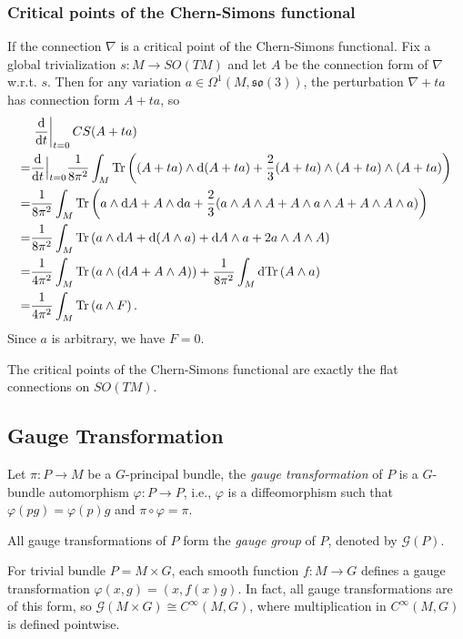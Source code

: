 \subsubsection*{Critical points of the Chern-Simons functional}
If the connection $\nabla$ is a critical point of the Chern-Simons functional.
Fix a global trivialization $s: M \to SO(TM)$ and let $A$ be the connection form of $\nabla$ w.r.t. $s$. 
Then for any variation $a \in \Omega^1(M, \mathfrak{so}(3))$, the perturbation $\nabla + ta$ has connection form $A + ta$, so
\begin{align*}
    &\left.\frac{\mathrm{d} }{\mathrm{d} t}\right|_{t=0}CS(A + ta) \\ 
    =& \frac{\mathrm{d} }{\mathrm{d} t}\Big|_{t=0} \frac{1}{8\pi^2}\int_M {\rm Tr}\left((A + ta) \wedge \mathrm{d}(A + ta) + \frac{2}{3}(A + ta) \wedge (A + ta) \wedge (A + ta)\right) \\ 
    =& \frac{1}{8\pi^2}\int_M {\rm Tr}\left(a \wedge \mathrm{d}A + A \wedge \mathrm{d}a + \frac{2}{3}(a \wedge A \wedge A + A \wedge a \wedge A + A \wedge A \wedge a)\right) \\ 
    =& \frac{1}{8\pi^2}\int_M {\rm Tr}\left(a \wedge \mathrm{d}A + {\rm d}(A\wedge a) + {\rm d} A\wedge a + 2a \wedge A \wedge A\right) \\ 
    =& \frac{1}{4\pi^2}\int_M {\rm Tr}\left(a \wedge ({\rm d} A + A\wedge A)\right) + \frac{1}{8\pi^2}\int_M {\rm d}{\rm Tr}\left(A\wedge a\right) \\ 
    =& \frac{1}{4\pi^2}\int_M {\rm Tr}\left(a \wedge F\right).
\end{align*}
Since $a$ is arbitrary, we have $F = 0$.
\begin{theorem}
    The critical points of the Chern-Simons functional are exactly the flat connections on $SO(TM)$.
\end{theorem}

\subsection{Gauge Transformation}
\begin{definition}
Let $\pi:P\to M$ be a $G$-principal bundle, the \emph{gauge transformation} of $P$ is a $G$-bundle automorphism $\varphi: P \to P$, 
i.e., $\varphi$ is a diffeomorphism such that $\varphi(pg) = \varphi(p)g$ and $\pi \circ \varphi = \pi$. 
\begin{center}
\end{center}
All gauge transformations of $P$ form the \emph{gauge group} of $P$, denoted by $\mathcal{G}(P)$.
\end{definition}
\begin{example}
    For trivial bundle $P = M \times G$, each smooth function $f: M \to G$ defines a gauge transformation $\varphi(x,g) = (x, f(x)g)$. 
    In fact, all gauge transformations are of this form, so $\mathcal{G}(M\times G) \cong C^{\infty}(M,G)$, 
    where multiplication in $C^{\infty}(M,G)$ is defined pointwise.
\end{example}


